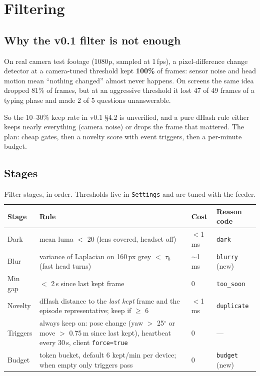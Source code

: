 \documentclass[11pt,a4paper]{article}
\begin{document}
\section{Filtering}
\subsection{Why the v0.1 filter is not enough}
\begin{measured}
On real camera test footage (1080p, sampled at 1\,fps), a pixel-difference change detector at a camera-tuned threshold kept \textbf{100\%} of frames: sensor noise and head motion mean ``nothing changed'' almost never happens. On screens the same idea dropped 81\% of frames, but at an aggressive threshold it lost 47 of 49 frames of a typing phase and made 2 of 5 questions unanswerable.
\end{measured}
\noindent So the 10--30\% keep rate in v0.1 \S4.2 is unverified, and a pure dHash rule either keeps nearly everything (camera noise) or drops the frame that mattered. The plan: cheap gates, then a novelty score with event triggers, then a per-minute budget.

\subsection{Stages}
\begin{table}[h]\centering\small
\begin{tabular}{P{2.6cm}P{6.4cm}P{2.2cm}P{2.4cm}}\toprule
\textbf{Stage} & \textbf{Rule} & \textbf{Cost} & \textbf{Reason code}\\\midrule
Dark & mean luma $<$ 20 (lens covered, headset off) & $<$1\,ms & \texttt{dark}\\
Blur & variance of Laplacian on 160\,px grey $<$ $\tau_b$ (fast head turns) & $\sim$1\,ms & \texttt{blurry} (new)\\
Min gap & $<$ 2\,s since last kept frame & 0 & \texttt{too\_soon}\\
Novelty & dHash distance to the \emph{last kept} frame and the episode representative; keep if $\ge$ 6 & $<$1\,ms & \texttt{duplicate}\\
Triggers & always keep on: pose change (yaw $>$ 25$^\circ$ or move $>$ 0.75\,m since last kept), heartbeat every 30\,s, client \texttt{force=true} & 0 & ---\\
Budget & token bucket, default 6 kept/min per device; when empty only triggers pass & 0 & \texttt{budget} (new)\\\bottomrule
\end{tabular}
\caption{Filter stages, in order. Thresholds live in \texttt{Settings} and are tuned with the feeder.}
\end{table}
\end{document}
